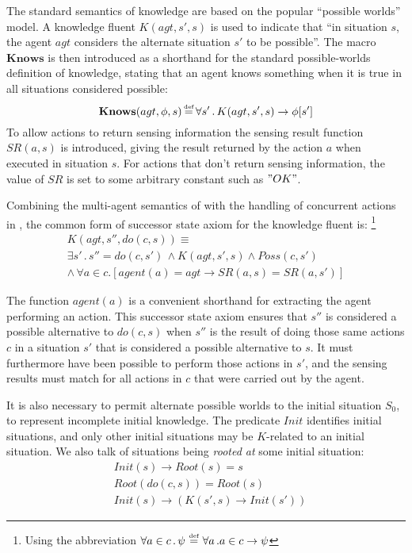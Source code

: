 \documentclass{ifaamas-submission}
\newcommand{\isdef}{\hbox{$\stackrel{\mbox{\tiny def}}{=}$}}
\begin{document}
The standard semantics of knowledge \cite{scherl03sc_knowledge} are
based on the popular {}``possible worlds'' model. A knowledge fluent
$K(agt,s',s)$ is used to indicate that {}``in situation $s$, the
agent $agt$ considers the alternate situation $s'$ to be possible''.
The macro $\mathbf{Knows}$ is then introduced as a shorthand for
the standard possible-worlds definition of knowledge, stating that
an agent knows something when it is true in all situations considered
possible: \begin{equation}
\mathbf{Knows}(agt,\phi,s)\,\isdef\,\forall s'\,.\, K(agt,s',s)\rightarrow\phi[s']\label{eqn:knows_def}\end{equation}
 To allow actions to return sensing information the sensing result
function $SR(a,s)$ is introduced, giving the result returned by the
action $a$ when executed in situation $s$. For actions that don't
return sensing information, the value of $SR$ is set to some arbitrary
constant such as $"OK"$.

Combining the multi-agent semantics of \cite{shapiro01casl_feat_inter}
with the handling of concurrent actions in \cite{scherl03conc_knowledge},
the common form of successor state axiom for the knowledge fluent
is:%
\footnote{Using the abbreviation $\forall a\in c\,.\,\psi\,\,\isdef\,\,\forall a\,.a\in c\rightarrow\psi$%
} \begin{multline}
K(agt,s'',do(c,s))\equiv\\
\exists s'\,.\, s''=do(c,s')\,\wedge K(agt,s',s)\wedge Poss(c,s')\\
\wedge\,\forall a\in c.\left[agent(a)=agt\rightarrow SR(a,s)=SR(a,s')\right]\label{eqn:k_ssa_standard}\end{multline}
 

The function $agent(a)$ is a convenient shorthand for extracting
the agent performing an action. This successor state axiom ensures
that $s''$ is considered a possible alternative to $do(c,s)$ when
$s''$ is the result of doing those same actions $c$ in a situation
$s'$ that is considered a possible alternative to $s$. It must furthermore
have been possible to perform those actions in $s'$, and the sensing
results must match for all actions in $c$ that were carried out by
the agent.

It is also necessary to permit alternate possible worlds to the initial
situation $S_{0}$, to represent incomplete initial knowledge. The
predicate $Init$ identifies initial situations, and only other initial
situations may be $K$-related to an initial situation. We also talk
of situations being \emph{rooted at} some initial situation: \begin{equation}
\begin{split} & Init(s)\rightarrow Root(s)=s\\
 & Root(do(c,s))=Root(s)\\
 & Init(s)\rightarrow\left(K(s',s)\rightarrow Init(s')\right)\end{split}
\label{eq:k_s0_standard}\end{equation}
\end{document}
